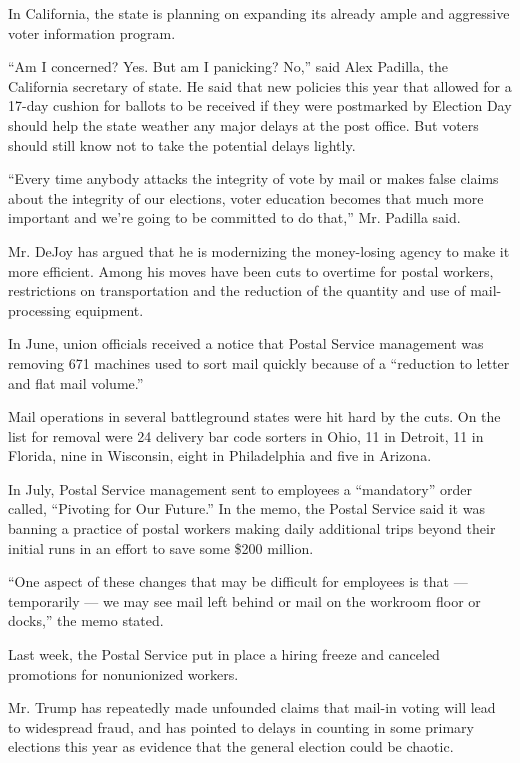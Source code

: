 In California, the state is planning on expanding its already ample and
aggressive voter information program.

``Am I concerned? Yes. But am I panicking? No,'' said Alex Padilla, the
California secretary of state. He said that new policies this year that
allowed for a 17-day cushion for ballots to be received if they were
postmarked by Election Day should help the state weather any major
delays at the post office. But voters should still know not to take the
potential delays lightly.

``Every time anybody attacks the integrity of vote by mail or makes
false claims about the integrity of our elections, voter education
becomes that much more important and we're going to be committed to do
that,'' Mr. Padilla said.

Mr. DeJoy has argued that he is modernizing the money-losing agency to
make it more efficient. Among his moves have been cuts to overtime for
postal workers, restrictions on transportation and the reduction of the
quantity and use of mail-processing equipment.

In June, union officials received a notice that Postal Service
management was removing 671 machines used to sort mail quickly because
of a ``reduction to letter and flat mail volume.''

Mail operations in several battleground states were hit hard by the
cuts. On the list for removal were 24 delivery bar code sorters in Ohio,
11 in Detroit, 11 in Florida, nine in Wisconsin, eight in Philadelphia
and five in Arizona.

In July, Postal Service management sent to employees a ``mandatory''
order called, ``Pivoting for Our Future.'' In the memo, the Postal
Service said it was banning a practice of postal workers making daily
additional trips beyond their initial runs in an effort to save some
\$200 million.

``One aspect of these changes that may be difficult for employees is
that --- temporarily --- we may see mail left behind or mail on the
workroom floor or docks,'' the memo stated.

Last week, the Postal Service put in place a hiring freeze and canceled
promotions for nonunionized workers.

Mr. Trump has repeatedly made unfounded claims that mail-in voting will
lead to widespread fraud, and has pointed to delays in counting in some
primary elections this year as evidence that the general election could
be chaotic.

